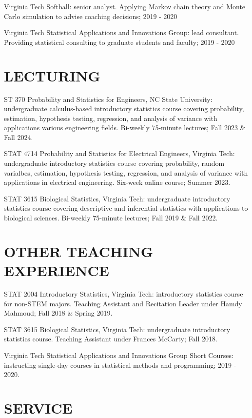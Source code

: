 \documentclass[margin,line,11pt]{res}
\begin{document}
\begin{resume}
{\sc Virginia Tech Softball}: senior analyst.  Applying Markov chain theory and Monte Carlo simulation to advise coaching decisions; 2019 - 2020

{\sc Virginia Tech Statistical Applications and Innovations Group}: lead consultant.  Providing statistical consulting to graduate students and faculty; 2019 - 2020


\medskip
\section{LECTURING}

{\sc ST 370 Probability and Statistics for Engineers, NC State University}: undergraduate calculus-based introductory statistics course covering probability, estimation, hypothesis testing, regression, and analysis of variance with applications various engineering fields. Bi-weekly 75-minute lectures; Fall 2023 \& Fall 2024.

{\sc STAT 4714 Probability and Statistics for Electrical Engineers, Virginia Tech}: undergraduate introductory statistics course covering probability, random varialbes, estimation, hypothesis testing, regression, and analysis of variance with applications in electrical engineering. Six-week online course; Summer 2023.

{\sc STAT 3615 Biological Statistics, Virginia Tech}: undergraduate introductory statistics course covering descriptive and inferential statistics with applications to biological sciences. Bi-weekly 75-minute lectures; Fall 2019 \& Fall 2022.



\medskip
\section{OTHER TEACHING EXPERIENCE}

{\sc STAT 2004 Introductory Statistics, Virginia Tech}: introductory statistics course for non-STEM majors.  Teaching Assistant and Recitation Leader under Hamdy Mahmoud; Fall 2018 \& Spring 2019.

{\sc STAT 3615 Biological Statistics, Virginia Tech}: undergraduate introductory statistics course.  Teaching Assistant under Frances McCarty; Fall 2018.

{\sc Virginia Tech Statistical Applications and Innovations Group Short Courses}: instructing single-day courses in statistical methods and programming; 2019 - 2020.

\medskip
\section{\bf SERVICE}


\end{resume}
\end{document}
